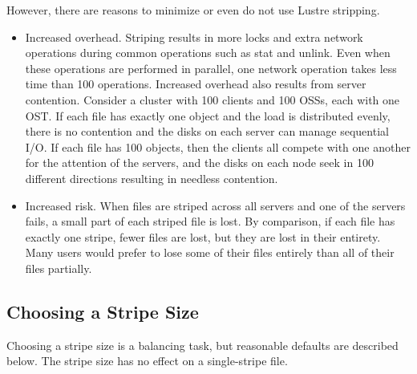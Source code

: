 \documentclass{article}
\begin{document}
However, there are reasons to minimize or even do not use Lustre stripping.
\begin{itemize}
    \item Increased overhead. Striping results in more locks and extra network operations during common operations such as stat and unlink. Even when these operations are performed in parallel, one network operation takes less time than 100 operations. Increased overhead also results from server contention. Consider a cluster with 100 clients and 100 OSSs, each with one OST. If each file has exactly one object and the load is distributed evenly, there is no contention and the disks on each server can manage sequential I/O. If each file has 100 objects, then the clients all compete with one another for the attention of the servers, and the disks on each node seek in 100 different directions resulting in needless contention.
    \item Increased risk. When files are striped across all servers and one of the servers fails, a small part of each striped file is lost. By comparison, if each file has exactly one stripe, fewer files are lost, but they are lost in their entirety. Many users would prefer to lose some of their files entirely than all of their files partially.
\end{itemize}

\subsection{Choosing a Stripe Size}
Choosing a stripe size is a balancing task, but reasonable defaults are described below. The stripe size has no effect on a single-stripe file.
\end{document}
